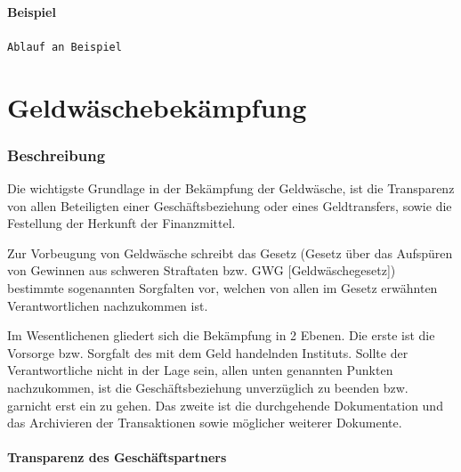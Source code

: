 \documentclass{article}
\begin{document}
        \subsection[Beispiel]{Beispiel}

            \texttt{Ablauf an Beispiel}

\newpage

\part[Bekämpfung]{Geldwäschebekämpfung}

    \section[Beschreibung]{Beschreibung}

        Die wichtigste Grundlage in der Bekämpfung der Geldwäsche, ist die Transparenz von allen Beteiligten einer Geschäftsbeziehung oder eines Geldtransfers, sowie die Festellung der Herkunft der Finanzmittel.

        Zur Vorbeugung von Geldwäsche schreibt das Gesetz (Gesetz über das Aufspüren von Gewinnen aus schweren Straftaten bzw. GWG [Geldwäschegesetz]) bestimmte sogenannten Sorgfalten vor, welchen von allen im Gesetz erwähnten Verantwortlichen nachzukommen ist.

        Im Wesentlichenen gliedert sich die Bekämpfung in 2 Ebenen. Die erste ist die Vorsorge bzw. Sorgfalt des mit dem Geld handelnden Instituts. Sollte der Verantwortliche nicht in der Lage sein, allen unten genannten Punkten nachzukommen, ist die Geschäftsbeziehung unverzüglich zu beenden bzw. garnicht erst ein zu gehen. 
        Das zweite ist die durchgehende Dokumentation und das Archivieren der Transaktionen sowie möglicher weiterer Dokumente.

        \subsection[Transparenz des Geschäftspartners]{Transparenz des Geschäftspartners}
\end{document}
